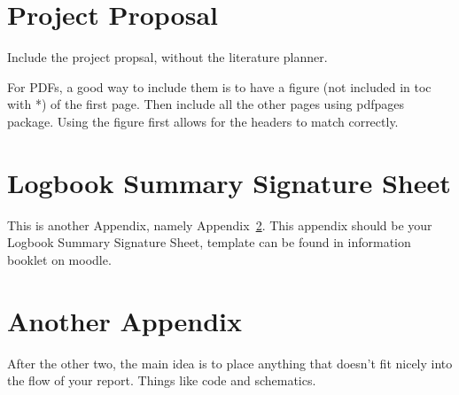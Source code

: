 \chapter{Project Proposal}\label{app:an}

Include the project propsal, without the literature planner.

For PDFs, a good way to include them is to have a figure (not included in toc with *) of the first page.
Then include all the other pages using pdfpages package. Using the figure first allows for the headers to
match correctly.


%

\chapter{Logbook Summary Signature Sheet}\label{app:another}

This is another Appendix, namely Appendix~\ref{app:another}. This appendix
should be your Logbook Summary Signature Sheet, template can be found in information booklet on moodle.

\chapter{Another Appendix}

After the other two, the main idea is to place anything that doesn't fit nicely into the flow of your report. Things like code and schematics.